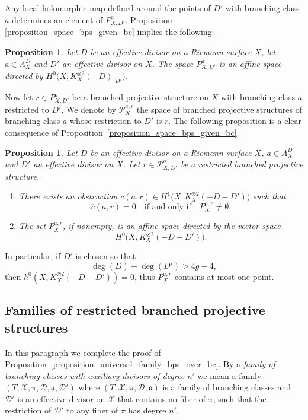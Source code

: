 \documentclass[10pt]{amsart}
\theoremstyle{definition}
\theoremstyle{plain}
\newtheorem{proposition}[definition]{Proposition}
\begin{document}
Any local holomorphic map defined around the points of $D'$ with branching class $a$ determines an element of $P_{X, D'}^a$.
Proposition \ref{proposition_space_bps_given_bc} implies the following:

\begin{proposition}\label{prop_struct_space_jets_bps}
Let $D$ be an effective divisor on a Riemann surface $X$, let $a \in A_X^D$ and $D'$ an effective divisor on $X$.
The space $P_{X, D'}^a$ is an affine space directed by $H^0\bigl(X, K_X^{\otimes 2}(-D)|_{D'}\bigr)$.
\end{proposition}

Now let $r \in P_{X, D'}^a$ be a branched projective structure on $X$ with branching class $a$ restricted to $D'$.
We denote by $\mathcal P_X^{a, r}$ the space of branched projective structures of branching class $a$ whose restriction to $D'$ is $r$.
The following proposition is a clear consequence of Proposition~\ref{proposition_space_bps_given_bc}.

\begin{proposition}\label{proposition_space_bps_given_rbps}
Let $D$ be an effective divisor on a Riemann surface $X$, $a \in A_X^D$ and $D'$ an effective divisor on $X$.
Let $r \in \mathcal P_{X, D'}^a$ be a restricted branched projective structure.
\begin{enumerate}
\item
There exists an obstruction $\overline c(a, r) \in H^1\bigl(X, K_X^{\otimes 2}(-D-D')\bigr)$ such that
\[
\overline c(a, r)=0\quad \text{if and only if}\quad P_X^{a, r} \neq \emptyset.
\]
\item
The set $P_X^{a, r}$, if nonempty, is an affine space directed by the vector space
\[
H^0\bigl(X, K_X^{\otimes 2}(-D-D')\bigr).
\]
\end{enumerate}
\end{proposition}

In particular, if $D'$ is chosen so that
\[
\deg(D) + \deg(D') > 4g-4,
\]
then $h^0\left(X, K_X^{\otimes 2}(-D-D')\right) = 0$, thus $P_X^{a, r}$ contains at most one point.

\subsection{Families of restricted branched projective structures}\label{subsection_families_rbps}

In this paragraph we complete the proof of Proposition~\ref{proposition_universal_family_bps_over_bc}.
By a \emph{family of branching classes with auxiliary divisors of degree $n'$} we mean a family $(T, \mathcal X, \pi, \mathcal D, \mathfrak a, \mathcal D')$ where $(T, \mathcal X, \pi, \mathcal D, \mathfrak a)$ is a family of branching classes and $\mathcal D'$ is an effective divisor on $\mathcal X$ that contains no fiber of $\pi$, such that the restriction of $\mathcal D'$ to any fiber of $\pi$ has degree $n'$.
\end{document}
